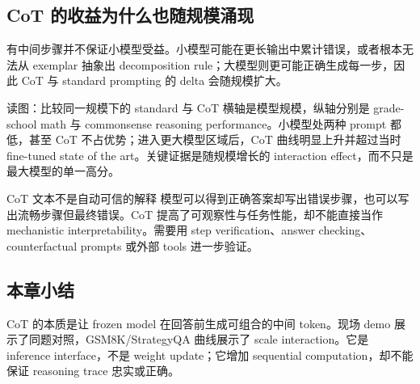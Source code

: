 \subsection{CoT 的收益为什么也随规模涌现}

有中间步骤并不保证小模型受益。小模型可能在更长输出中累计错误，或者根本无法从 exemplar 抽象出 decomposition rule；大模型则更可能正确生成每一步，因此 CoT 与 standard prompting 的 delta 会随规模扩大。


\begin{knowledgebox}{读图：比较同一规模下的 standard 与 CoT}
横轴是模型规模，纵轴分别是 grade-school math 与 commonsense reasoning performance。小模型处两种 prompt 都低，甚至 CoT 不占优势；进入更大模型区域后，CoT 曲线明显上升并超过当时 fine-tuned state of the art。关键证据是随规模增长的 interaction effect，而不只是最大模型的单一高分。
\end{knowledgebox}

\begin{warningbox}{CoT 文本不是自动可信的解释}
模型可以得到正确答案却写出错误步骤，也可以写出流畅步骤但最终错误。CoT 提高了可观察性与任务性能，却不能直接当作 mechanistic interpretability。需要用 step verification、answer checking、counterfactual prompts 或外部 tools 进一步验证。
\end{warningbox}

\subsection{本章小结}

CoT 的本质是让 frozen model 在回答前生成可组合的中间 token。现场 demo 展示了同题对照，GSM8K/StrategyQA 曲线展示了 scale interaction。它是 inference interface，不是 weight update；它增加 sequential computation，却不能保证 reasoning trace 忠实或正确。

